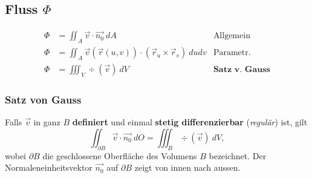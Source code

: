 \subsection{Fluss \hfill $\Phi$}
    \vspace{-1em}
    \begin{align*}
        \Phi &= \iint_A \vec{v} \cdot \vec{n_0} \ dA &\textrm{Allgemein}\\
        \Phi &= \iint_A \vec{v}(\vec{r}(u,v)) \cdot (\vec{r}_u \times \vec{r}_v) \ du dv &\textrm{Parametr.}\\
        \Phi &= \iiint_V \div(\vec{v}) \ dV &\textbf{Satz\ v. Gauss}
    \end{align*}

    \subsubsection{Satz von Gauss}
        Falls $\vec{v}$ in ganz $B$ \textbf{definiert} und einmal \textbf{stetig differenzierbar} (\textit{regulär}) ist, gilt
        $$
            \iint_{\partial B} \vec{v} \cdot \vec{n_0} \ dO = \iiint_B \div(\vec{v}) \ dV,
        $$
        wobei $\partial B$ die geschlossene Oberfläche des Volumens $B$ bezeichnet.
        Der Normaleneinheitsvektor $\vec{n_0}$ auf $\partial B$ zeigt von innen nach aussen.
